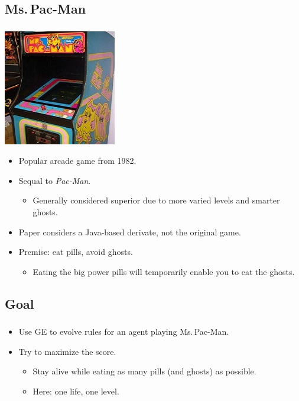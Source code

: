 \documentclass{beamer}
\makeatletter
\newcommand*{\currentname}{\@currentlabelname}
\makeatother
\begin{document}
\subsection{Ms.\,Pac-Man}
\begin{frame}
\frametitle{\currentname}
\begin{center}
	\includegraphics[scale=0.5]{mspacmankast.jpg}
\end{center}

\begin{itemize}
	\item Popular arcade game from 1982.
	\item Sequal to \textit{Pac-Man}. 
	\begin{itemize}
		\item Generally considered superior due to more varied levels and smarter ghosts.
	\end{itemize}
	\item Paper considers a Java-based derivate, not the original game.
\end{itemize}

\begin{itemize}
	\item Premise: eat pills, avoid ghosts.
	\begin{itemize}
		\item Eating the big power pills will temporarily enable you to eat the ghosts.
	\end{itemize}
\end{itemize}

\end{frame}

\subsection{Goal}
\begin{frame}
\frametitle{\currentname}

\begin{itemize}
	\item Use GE to evolve rules for an agent playing Ms.\,Pac-Man.
	\item Try to maximize the score.
	\begin{itemize}
		\item Stay alive while eating as many pills (and ghosts) as possible.
		\item Here: one life, one level.
	\end{itemize}
\end{itemize}

\end{frame}
\end{document}
